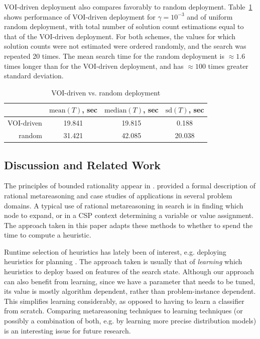 VOI-driven deployment also compares favorably to
random deployment. Table~\ref{tbl:voirnd} shows
performance of VOI-driven deployment for $\gamma=10^{-3}$ and of
uniform random deployment, with total number of solution count estimations
equal to that of the VOI-driven deployment.
For both schemes, the values for which solution
counts were not estimated were ordered randomly, and the search
was repeated 20 times.  The mean search time for the random deployment is
$\approx1.6$ times longer than for the VOI-driven deployment, and has
$\approx100$ times greater standard deviation.
\begin{table}[h]
\begin{center}
\small
\begin{tabular}{r|c|c|c}
               & $\mathrm{mean}(T)$, sec & $\mathrm{median}(T)$, sec & $\mathrm{sd}(T)$, sec \\ \hline
VOI-driven     & 19.841                  & 19.815                    & 0.188 \\ \hline
random         & 31.421                  & 42.085                    & 20.038  
\end{tabular}
\end{center}
\caption{VOI-driven vs. random deployment}
\label{tbl:voirnd}
\end{table}

\subsection{Discussion and Related Work}
\label{sec:discussion}

The principles of bounded rationality appear in
\cite{Horvitz.reasoningabout}. \cite{Russell.right}
provided a formal description of rational metareasoning and case
studies of applications in several problem domains.
A typical use of rational metareasoning in search is in finding which node
to expand, or in a CSP context determining a variable or value assignment.
The approach taken in this paper adapts these methods to
whether to spend the time to compute a heuristic.

Runtime selection of heuristics has lately been of interest, e.g.
deploying heuristics for planning \cite{Domshlak.maxornot}. The approach
taken is usually that of {\em learning} which heuristics to deploy based on
features of the search state. Although our approach can also benefit from learning,
since we have a parameter that needs to be
tuned, its value is mostly algorithm dependent,
rather than problem-instance dependent. This simplifies learning 
considerably, as opposed to having to learn a classifier from scratch.
Comparing metareasoning techniques to learning techniques (or possibly a combination
of both, e.g. by learning more precise distribution models) is an interesting issue for future research.

